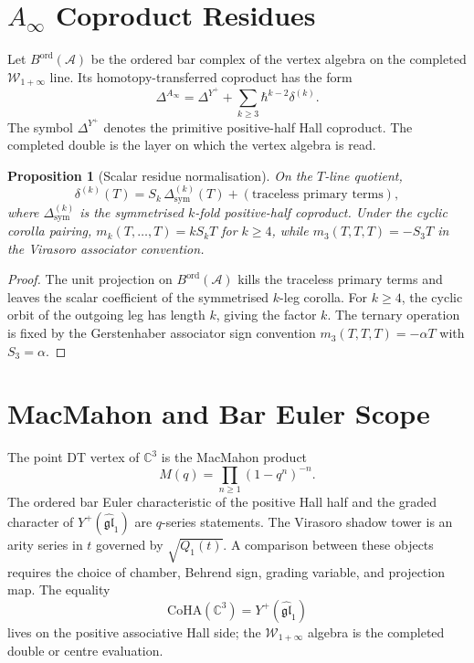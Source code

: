 \documentclass[11pt]{article}
\newtheorem{proposition}[theorem]{Proposition}
\begin{document}
\section{$A_\infty$ Coproduct Residues}

Let $B^{\mathrm{ord}}(\mathcal A)$ be the ordered bar complex of the
vertex algebra on the completed $\mathcal W_{1+\infty}$ line. Its
homotopy-transferred coproduct has the form
\[
  \Delta^{A_\infty}
  =
  \Delta^{Y^+}
  +\sum_{k\geq3}\hbar^{k-2}\delta^{(k)}.
\]
The symbol $\Delta^{Y^+}$ denotes the primitive positive-half Hall
coproduct. The completed double is the layer on which the vertex
algebra is read.

\begin{proposition}[Scalar residue normalisation]
\label{prop:scalar-residue-normalisation}
On the $T$-line quotient,
\[
  \delta^{(k)}(T)
  =
  S_k\,\Delta_{\mathrm{sym}}^{(k)}(T)
  +(\text{traceless primary terms}),
\]
where $\Delta_{\mathrm{sym}}^{(k)}$ is the symmetrised $k$-fold
positive-half coproduct. Under the cyclic corolla pairing,
$m_k(T,\ldots,T)=kS_kT$ for $k\geq4$, while
$m_3(T,T,T)=-S_3T$ in the Virasoro associator convention.
\end{proposition}

\begin{proof}
The unit projection on $B^{\mathrm{ord}}(\mathcal A)$ kills the
traceless primary terms and leaves the scalar coefficient of the
symmetrised $k$-leg corolla. For $k\geq4$, the cyclic orbit of the
outgoing leg has length $k$, giving the factor $k$. The ternary
operation is fixed by the Gerstenhaber associator sign convention
$m_3(T,T,T)=-\alpha T$ with $S_3=\alpha$.
\end{proof}

\section{MacMahon and Bar Euler Scope}

The point DT vertex of $\mathbb C^3$ is the MacMahon product
\[
  M(q)=\prod_{n\geq1}(1-q^n)^{-n}.
\]
The ordered bar Euler characteristic of the positive Hall half and the
graded character of $Y^+(\widehat{\mathfrak{gl}}_1)$ are $q$-series
statements. The Virasoro shadow tower is an arity series in $t$ governed
by $\sqrt{Q_1(t)}$. A comparison between these objects requires the
choice of chamber, Behrend sign, grading variable, and projection map.
The equality
\[
  \mathrm{CoHA}(\mathbb C^3)=Y^+(\widehat{\mathfrak{gl}}_1)
\]
lives on the positive associative Hall side; the
$\mathcal W_{1+\infty}$ algebra is the completed double or centre
evaluation.
\end{document}

